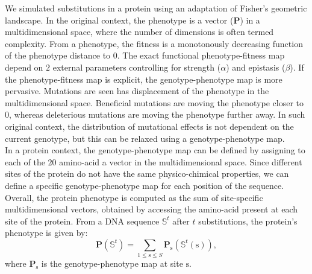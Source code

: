 \documentclass{article}
\newcommand{\Nsite}{S}
\newcommand{\site}{\text{s}}
\newcommand{\phenoGeo}{\bm{P}}
\begin{document}
We simulated substitutions in a protein using an adaptation of Fisher's geometric landscape.
In the original context, the phenotype is a vector ($\phenoGeo$) in a multidimensional space, where the number of dimensions is often termed complexity.
From a phenotype, the fitness is a monotonously decreasing function of the phenotype distance to $0$.
The exact functional phenotype-fitness map depend on $2$ external parameters controlling for strength ($\alpha$) and epistasis ($\beta$).
If the phenotype-fitness map is explicit, the genotype-phenotype map is more pervasive.
Mutations are seen has displacement of the phenotype in the multidimensional space.
Beneficial mutations are moving the phenotype closer to $0$, whereas deleterious mutations are moving the phenotype further away.
In such original context, the distribution of mutational effects is not dependent on the current genotype, but this can be relaxed using a genotype-phenotype map.\\

In a protein context, the genotype-phenotype map can be defined by assigning to each of the $20$ amino-acid a vector in the multidimensional space.
Since different sites of the protein do not have the same physico-chimical properties, we can define a specific genotype-phenotype map for each position of the sequence.
Overall, the protein phenotype is computed as the sum of site-specific multidimensional vectors, obtained by accessing the amino-acid present at each site of the protein.
From a DNA sequence $\mathbb{S}^t$ after $t$ substitutions, the protein's phenotype is given by:
\begin{equation}
\phenoGeo\left(\mathbb{S}^{t}\right) = \sum_{1 \leq \site \leq \Nsite} \phenoGeo_{\site} \left(\mathbb{S}^t(\site) \right),
\end{equation}
where $\phenoGeo_{\site}$ is the genotype-phenotype map at site $\site$.\\
\end{document}
